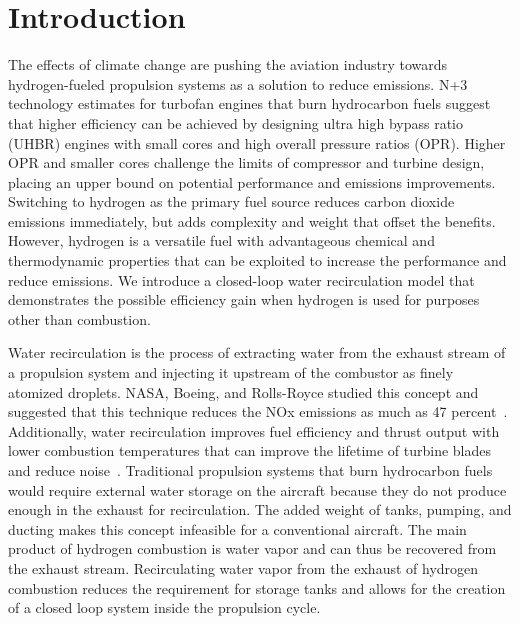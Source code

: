 \documentclass[conf]{new-aiaa}
\begin{document}
\section{Introduction}
The effects of climate change are pushing the aviation industry towards hydrogen-fueled propulsion systems as a solution to reduce emissions.
N+3 technology estimates for turbofan engines that burn hydrocarbon fuels suggest that higher efficiency can be achieved by designing ultra high bypass ratio (UHBR) engines with small cores and high overall pressure ratios (OPR).
Higher OPR and smaller cores challenge the limits of compressor and turbine design, placing an upper bound on potential performance and emissions improvements.
Switching to hydrogen as the primary fuel source reduces carbon dioxide emissions immediately, but adds complexity and weight that offset the benefits.
However, hydrogen is a versatile fuel with advantageous chemical and thermodynamic properties that can be exploited to increase the performance and reduce emissions.
We introduce a closed-loop water recirculation model that demonstrates the possible efficiency gain when hydrogen is used for purposes other than combustion.

Water recirculation is the process of extracting water from the exhaust stream of a propulsion system and injecting it upstream of the combustor as finely atomized droplets.
NASA, Boeing, and Rolls-Royce studied this concept and suggested that this technique reduces the NOx emissions as much as 47 percent~\cite{Daggett2010}.
Additionally, water recirculation improves fuel efficiency and thrust output with lower combustion temperatures that can improve the lifetime of turbine blades and reduce noise~\cite{Daggett2010}.
Traditional propulsion systems that burn hydrocarbon fuels would require external water storage on the aircraft because they do not produce enough in the exhaust for recirculation.
The added weight of tanks, pumping, and ducting makes this concept infeasible for a conventional aircraft.
The main product of hydrogen combustion is water vapor and can thus be recovered from the exhaust stream.
Recirculating water vapor from the exhaust of hydrogen combustion reduces the requirement for storage tanks and allows for the creation of a closed loop system inside the propulsion cycle.
\end{document}
